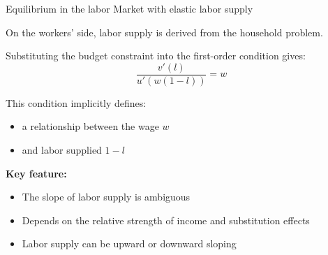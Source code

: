 \documentclass[10pt,aspectratio=169]{beamer}
\begin{document}
\begin{frame}{Equilibrium in the labor Market with elastic labor supply}

\small
On the workers’ side, labor supply is derived from the household problem.

\bigskip

Substituting the budget constraint into the first-order condition gives:
\[
\frac{v'(l)}{u'\!\left(w(1-l)\right)} = w
\]

\bigskip

This condition implicitly defines:
\begin{itemize}
    \item a relationship between the wage $w$
    \item and labor supplied $1-l$
\end{itemize}

\bigskip

\textbf{Key feature:}
\begin{itemize}
    \item The slope of labor supply is ambiguous
    \item Depends on the relative strength of income and substitution effects
    \item Labor supply can be upward or downward sloping 
\end{itemize}

\end{frame}
\end{document}
